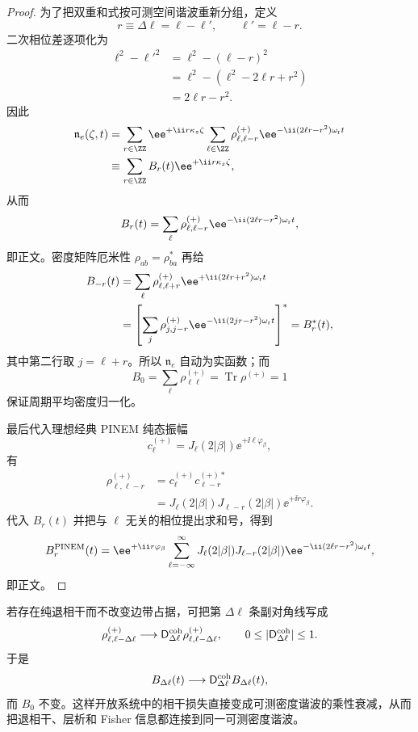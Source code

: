 \begin{proof}
为了把双重和式按可测空间谐波重新分组，定义
\[
r\equiv\Delta\ell=\ell-\ell',
\qquad
\ell'=\ell-r.
\]
二次相位差逐项化为
\begin{align*}
\ell^2-\ell'^2
&=\ell^2-(\ell-r)^2\\
&=\ell^2-(\ell^2-2\ell r+r^2)\\
&=2\ell r-r^2.
\end{align*}
因此
\begin{align*}
\mathfrak n_e(\zeta,t)
&=\sum_{r\in\ZZ}
\ee^{+\ii r\kappa_z\zeta}
\sum_{\ell\in\ZZ}
\rho_{\ell,\ell-r}^{(+)}
\ee^{-\ii(2\ell r-r^2)\omega_{\rm r}t}\\
&\equiv
\sum_{r\in\ZZ}B_r(t)
\ee^{+\ii r\kappa_z\zeta},
\end{align*}
从而
\[
B_r(t)
=\sum_\ell
\rho_{\ell,\ell-r}^{(+)}
\ee^{-\ii(2\ell r-r^2)\omega_{\rm r}t},
\]
即正文。密度矩阵厄米性
$\rho_{ab}=\rho_{ba}^*$ 再给
\begin{align*}
B_{-r}(t)
&=\sum_\ell
\rho_{\ell,\ell+r}^{(+)}
\ee^{+\ii(2\ell r+r^2)\omega_{\rm r}t}\\
&=\left[
\sum_j
\rho_{j,j-r}^{(+)}
\ee^{-\ii(2jr-r^2)\omega_{\rm r}t}
\right]^*
=B_r^*(t),
\end{align*}
其中第二行取 $j=\ell+r$。所以 $\mathfrak n_e$ 自动为实函数；而
\[
B_0=\sum_\ell\rho_{\ell\ell}^{(+)}
=\operatorname{Tr}\rho^{(+)}=1
\]
保证周期平均密度归一化。

最后代入理想经典 PINEM 纯态振幅
\[
c_\ell^{(+)}
=J_\ell(2|\beta|)\ee^{+\ii\ell\varphi_\beta},
\]
有
\begin{align*}
\rho_{\ell,\ell-r}^{(+)}
&=c_\ell^{(+)}c_{\ell-r}^{(+)*}\\
&=J_\ell(2|\beta|)J_{\ell-r}(2|\beta|)
\ee^{+\ii r\varphi_\beta}.
\end{align*}
代入 $B_r(t)$ 并把与 $\ell$ 无关的相位提出求和号，得到
\[
{
B_r^{\rm PINEM}(t)
=\ee^{+\ii r\varphi_\beta}
\sum_{\ell=-\infty}^{\infty}
J_\ell(2|\beta|)J_{\ell-r}(2|\beta|)
\ee^{-\ii(2\ell r-r^2)\omega_{\rm r}t},}
\]
即正文。
\end{proof}


若存在纯退相干而不改变边带占据，可把第 $\Delta\ell$ 条副对角线写成
\begin{equation*}
 \rho_{\ell,\ell-\Delta\ell}^{(+)}
 \longrightarrow
 \mathsf D_{\Delta\ell}^{\rm coh}\rho_{\ell,\ell-\Delta\ell}^{(+)},
 \qquad 0\le|\mathsf D_{\Delta\ell}^{\rm coh}|\le1.
\end{equation*}
于是
\begin{equation}
{B_{\Delta\ell}(t)\longrightarrow\mathsf D_{\Delta\ell}^{\rm coh} B_{\Delta\ell}(t),}
\label{eq:bunching_dephasing_transfer_dp46}
\end{equation}
而 $B_0$ 不变。这样开放系统中的相干损失直接变成可测密度谐波的乘性衰减，从而把退相干、层析和 Fisher 信息都连接到同一可测密度谐波。

